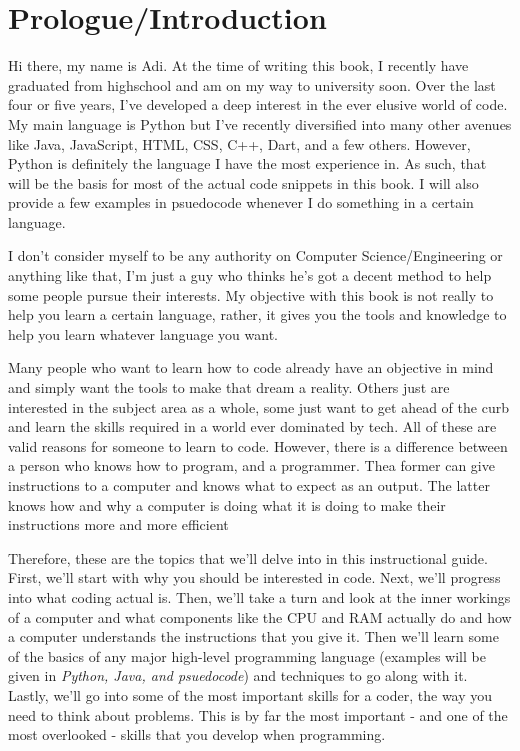 \documentclass[12pt,a4paper]{book}
\begin{document}
	
	\chapter*{Prologue/Introduction}  \label{chap:intro}
		Hi there, my name is Adi. At the time of writing this book, I recently have graduated from highschool and am on my way to university soon. Over the last four or five years, I've developed a deep interest in the ever elusive world of code. My main language is Python but I've recently diversified into many other avenues like Java, JavaScript, HTML, CSS, C++, Dart, and a few others. However, Python is definitely the language I have the most experience in. As such, that will be the basis for most of the actual code snippets in this book. I will also provide a few examples in psuedocode whenever I do something in a certain language. 
		
		I don't consider myself to be any authority on Computer Science/Engineering or anything like that, I'm just a guy who thinks he's got a decent method to help some people pursue their interests. My objective with this book is not really to help you learn a certain language, rather, it gives you the tools and knowledge to help you learn whatever language you want.
		
		Many people who want to learn how to code already have an objective in mind and simply want the tools to make that dream a reality. Others just are interested in the subject area as a whole, some just want to get ahead of the curb and learn the skills required in a world ever dominated by tech. All of these are valid reasons for someone to learn to code. However, there is a difference between a person who knows how to program, and a programmer. Thea former can give instructions to a computer and knows what to expect as an output. The latter knows how and why a computer is doing what it is doing to make their instructions more and more efficient
		
		Therefore, these are the topics that we'll delve into in this instructional guide. First, we'll start with why you should be interested in code. Next, we'll progress into what coding actual is. Then, we'll take a turn and look at the inner workings of a computer and what components like the CPU and RAM actually do and how a computer understands the instructions that you give it. Then we'll learn some of the basics of any major high-level programming language (examples will be given in \textit{Python, Java, and psuedocode}) and techniques to go along with it. Lastly, we'll go into some of the most important skills for a coder, the way you need to think about problems. This is by far the most important - and one of the most overlooked - skills that you develop when programming.
		
\end{document}
